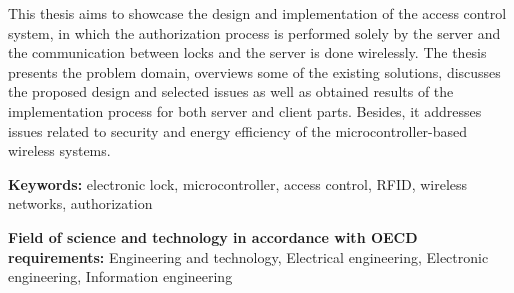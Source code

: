 	This thesis aims to showcase the design and implementation of the access control system, in which the authorization process is performed solely by the server and the communication between locks and the server is done wirelessly. The thesis presents the problem domain, overviews some of the existing solutions, discusses the proposed design and selected issues as well as obtained results of the implementation process for both server and client parts. Besides, it addresses issues related to security and energy efficiency of the microcontroller-based wireless systems.

	\textbf{Keywords:} electronic lock, microcontroller, access control, RFID, wireless networks, authorization

	\textbf{Field of science and technology in accordance with OECD requirements:} Engineering and technology, Electrical engineering, Electronic engineering, Information engineering